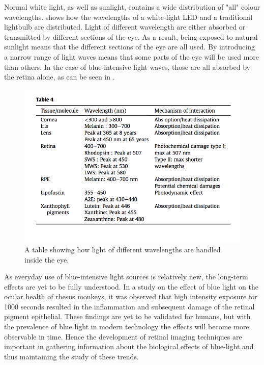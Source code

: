 Normal white light, as well as sunlight, contains a wide distribution of "all" colour
wavelengths.  shows how the wavelengths of a white-light LED and a
traditional lightbulb are distributed. Light of different wavelength are either absorbed
or transmitted by different sections of the eye. As a result, being exposed to natural
sunlight means that the different sections of the eye are all used. By introducing a
narrow range of light waves means that some parts of the eye will be used more than
others. In the case of blue-intensive light waves, those are all absorbed by the retina
alone, as can be seen in .

\begin{figure}[htbp]
\centering
\includegraphics{figures/wavelength}
\caption{A table showing how light of different wavelengths are handled inside the eye.}
\label{fig:wl}
\end{figure}

As everyday use of blue-intensive light sources is relatively new, the long-term effects are
yet to be fully understood. In a study on the effect of blue light on the ocular health of
rhesus monkeys, it was observed that high intensity exposure for 1000 seconds resulted
in the inflammation and subsequent damage of the retinal pigment epithelial. \cite{ham1980nature}
These findings are yet to be validated for humans, but with the prevalence of blue light in
modern technology the effects will become more observable in time.
Hence the development of retinal imaging techniques are important in gathering information
about the biological effects of blue-light and thus maintaining the study of these trends.

